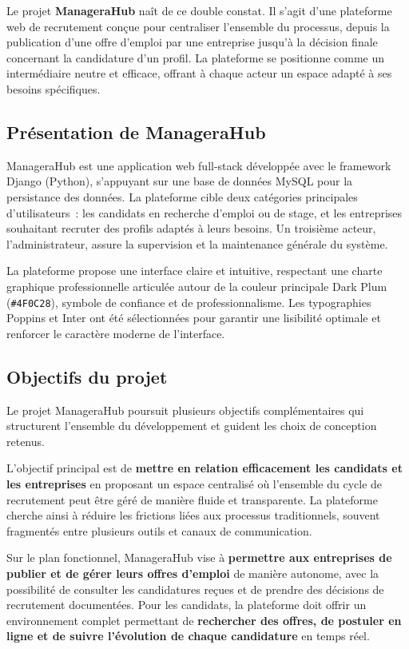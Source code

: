 \documentclass[12pt,a4paper]{report}
\begin{document}
Le projet \textbf{ManageraHub} naît de ce double constat. Il s'agit d'une plateforme web de recrutement conçue pour centraliser l'ensemble du processus, depuis la publication d'une offre d'emploi par une entreprise jusqu'à la décision finale concernant la candidature d'un profil. La plateforme se positionne comme un intermédiaire neutre et efficace, offrant à chaque acteur un espace adapté à ses besoins spécifiques.

\subsection{Présentation de ManageraHub}

ManageraHub est une application web full-stack développée avec le framework Django (Python), s'appuyant sur une base de données MySQL pour la persistance des données. La plateforme cible deux catégories principales d'utilisateurs~: les candidats en recherche d'emploi ou de stage, et les entreprises souhaitant recruter des profils adaptés à leurs besoins. Un troisième acteur, l'administrateur, assure la supervision et la maintenance générale du système.

La plateforme propose une interface claire et intuitive, respectant une charte graphique professionnelle articulée autour de la couleur principale Dark Plum (\texttt{\#4F0C28}), symbole de confiance et de professionnalisme. Les typographies Poppins et Inter ont été sélectionnées pour garantir une lisibilité optimale et renforcer le caractère moderne de l'interface.

\subsection{Objectifs du projet}

Le projet ManageraHub poursuit plusieurs objectifs complémentaires qui structurent l'ensemble du développement et guident les choix de conception retenus.

L'objectif principal est de \textbf{mettre en relation efficacement les candidats et les entreprises} en proposant un espace centralisé où l'ensemble du cycle de recrutement peut être géré de manière fluide et transparente. La plateforme cherche ainsi à réduire les frictions liées aux processus traditionnels, souvent fragmentés entre plusieurs outils et canaux de communication.

Sur le plan fonctionnel, ManageraHub vise à \textbf{permettre aux entreprises de publier et de gérer leurs offres d'emploi} de manière autonome, avec la possibilité de consulter les candidatures reçues et de prendre des décisions de recrutement documentées. Pour les candidats, la plateforme doit offrir un environnement complet permettant de \textbf{rechercher des offres, de postuler en ligne et de suivre l'évolution de chaque candidature} en temps réel.
\end{document}
